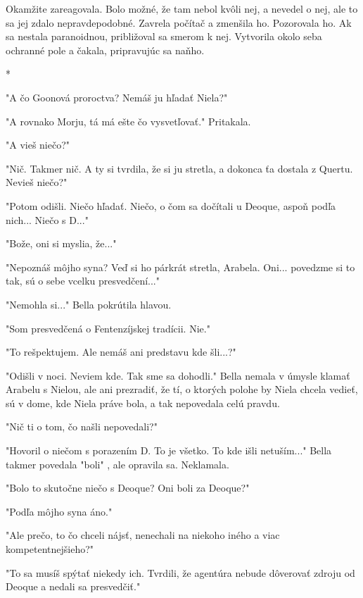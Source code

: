 \documentclass{book}
\begin{document}
Okamžite zareagovala. Bolo možné, že tam nebol kvôli nej, a nevedel o nej, ale to sa jej zdalo nepravdepodobné. Zavrela počítač a zmenšila ho. Pozorovala ho. Ak sa nestala paranoidnou, približoval sa smerom k nej. Vytvorila okolo seba ochranné pole a čakala, pripravujúc sa naňho.

\begin{center}

*

\end{center}

"$ $A čo Goonová proroctva? Nemáš ju hľadať Niela?"$ $ 

"$ $A rovnako Morju, tá má ešte čo vysvetľovať."$ $  Pritakala.

"$ $A vieš niečo?"$ $ 

"$ $Nič. Takmer nič. A ty si tvrdila, že si ju stretla, a dokonca ťa dostala z Quertu. Nevieš niečo?"$ $ 

"$ $Potom odišli. Niečo hľadať. Niečo, o čom sa dočítali u Deoque, aspoň podľa nich... Niečo s D..."$ $ 

"$ $Bože, oni si myslia, že..."$ $ 

"$ $Nepoznáš môjho syna? Veď si ho párkrát stretla, Arabela. Oni... povedzme si to tak, sú o sebe vcelku presvedčení..."$ $ 

"$ $Nemohla si..."$ $  Bella pokrútila hlavou.

"$ $Som presvedčená o Fentenzíjskej tradícii. Nie."$ $ 

"$ $To rešpektujem. Ale nemáš ani predstavu kde šli...?"$ $ 

"$ $Odišli v noci. Neviem kde. Tak sme sa dohodli."$ $  Bella nemala v úmysle klamať Arabelu s Nielou, ale ani prezradiť, že tí, o ktorých polohe by Niela chcela vedieť, sú v dome, kde Niela práve bola, a tak nepovedala celú pravdu.

"$ $Nič ti o tom, čo našli nepovedali?"$ $ 

"$ $Hovoril o niečom s porazením D. To je všetko. To kde išli netuším..."$ $  Bella takmer povedala "$ $boli"$ $ , ale opravila sa. Neklamala.

"$ $Bolo to skutočne niečo s Deoque? Oni boli za Deoque?"$ $ 

"$ $Podľa môjho syna áno."$ $ 

"$ $Ale prečo, to čo chceli nájsť, nenechali na niekoho iného a viac kompetentnejšieho?"$ $ 

"$ $To sa musíš spýtať niekedy ich. Tvrdili, že agentúra nebude dôverovať zdroju od Deoque a nedali sa presvedčiť."$ $ 
\end{document}

